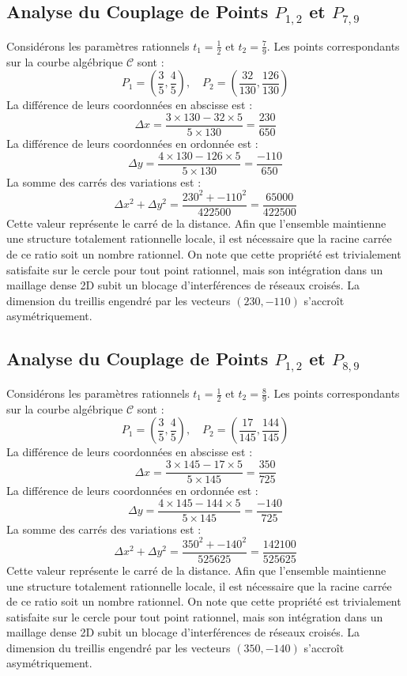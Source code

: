 \documentclass[12pt, a4paper]{article}
\begin{document}
\subsection{Analyse du Couplage de Points $P_{1,2}$ et $P_{7,9}$}
Considérons les paramètres rationnels $t_1 = \frac{1}{2}$ et $t_2 = \frac{7}{9}$.
Les points correspondants sur la courbe algébrique $\mathcal{C}$ sont :
$$ P_1 = \left( \frac{3}{5}, \frac{4}{5} \right), \quad P_2 = \left( \frac{32}{130}, \frac{126}{130} \right) $$
La différence de leurs coordonnées en abscisse est :
$$ \Delta x = \frac{3 \times 130 - 32 \times 5}{5 \times 130} = \frac{230}{650} $$
La différence de leurs coordonnées en ordonnée est :
$$ \Delta y = \frac{4 \times 130 - 126 \times 5}{5 \times 130} = \frac{-110}{650} $$
La somme des carrés des variations est :
$$ \Delta x^2 + \Delta y^2 = \frac{ 230^2 + -110^2 }{ 422500 } = \frac{ 65000 }{ 422500 } $$
Cette valeur représente le carré de la distance. Afin que l'ensemble maintienne une structure totalement rationnelle locale, il est nécessaire que la racine carrée de ce ratio soit un nombre rationnel. On note que cette propriété est trivialement satisfaite sur le cercle pour tout point rationnel, mais son intégration dans un maillage dense 2D subit un blocage d'interférences de réseaux croisés. La dimension du treillis engendré par les vecteurs $( 230, -110 )$ s'accroît asymétriquement.


\subsection{Analyse du Couplage de Points $P_{1,2}$ et $P_{8,9}$}
Considérons les paramètres rationnels $t_1 = \frac{1}{2}$ et $t_2 = \frac{8}{9}$.
Les points correspondants sur la courbe algébrique $\mathcal{C}$ sont :
$$ P_1 = \left( \frac{3}{5}, \frac{4}{5} \right), \quad P_2 = \left( \frac{17}{145}, \frac{144}{145} \right) $$
La différence de leurs coordonnées en abscisse est :
$$ \Delta x = \frac{3 \times 145 - 17 \times 5}{5 \times 145} = \frac{350}{725} $$
La différence de leurs coordonnées en ordonnée est :
$$ \Delta y = \frac{4 \times 145 - 144 \times 5}{5 \times 145} = \frac{-140}{725} $$
La somme des carrés des variations est :
$$ \Delta x^2 + \Delta y^2 = \frac{ 350^2 + -140^2 }{ 525625 } = \frac{ 142100 }{ 525625 } $$
Cette valeur représente le carré de la distance. Afin que l'ensemble maintienne une structure totalement rationnelle locale, il est nécessaire que la racine carrée de ce ratio soit un nombre rationnel. On note que cette propriété est trivialement satisfaite sur le cercle pour tout point rationnel, mais son intégration dans un maillage dense 2D subit un blocage d'interférences de réseaux croisés. La dimension du treillis engendré par les vecteurs $( 350, -140 )$ s'accroît asymétriquement.
\end{document}
